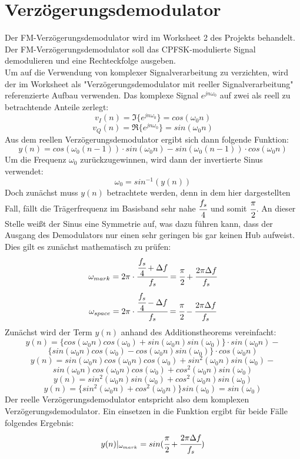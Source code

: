 \documentclass{article}
\begin{document}
\section{Verzögerungsdemodulator} \label{sec:fm-demod}
Der FM-Verzögerungsdemodulator wird im Worksheet 2 des Projekts behandelt.
Der FM-Verzögerungsdemodulator soll das \ac{CPFSK}-modulierte Signal demodulieren und eine Rechteckfolge ausgeben.\\
Um auf die Verwendung von komplexer Signalverarbeitung zu verzichten, wird der im Worksheet als "Verzögerungsdemodulator mit 
reeller Signalverarbeitung" referenzierte Aufbau verwenden. Das komplexe Signal $e^{jn\omega_0}$ 
auf zwei als reell zu betrachtende Anteile zerlegt:
$$
v_I(n) = \Im\{e^{jn\omega_0}\} = cos(\omega_0 n)
$$
$$
v_Q(n) = \Re{\{e^{jn\omega_0}\}} = sin(\omega_0 n)
$$
Aus dem reellen Verzögerungsdemodulator ergibt sich dann folgende Funktion:
$$
y(n) = cos(\omega_0 (n-1)) \cdot sin(\omega_0 n) - sin(\omega_0 (n-1)) \cdot cos(\omega_0 n) 
$$
Um die Frequenz $\omega_0$ zurückzugewinnen, wird dann der invertierte Sinus verwendet:
$$
\omega_0 = sin^{-1}(y(n))
$$ 
Doch zunächst muss $y(n)$ betrachtete werden, denn in dem hier dargestellten Fall, fällt die Trägerfrequenz im Basisband sehr nahe $\cfrac{f_s}{4}$ und somit $\cfrac{\pi}{2}$. An dieser Stelle weißt der Sinus eine Symmetrie auf, was dazu führen kann, dass der Ausgang des Demodulators nur einen sehr geringen bis gar keinen Hub aufweist. Dies gilt es zunächst mathematisch zu prüfen:
$$
\omega_{mark} = 2 \pi\cdot \cfrac{\cfrac{f_s}{4}+\Delta f}{f_s}=\cfrac{\pi}{2}+\cfrac{2 \pi \Delta f}{f_s}
$$
$$
\omega_{space} = 2 \pi\cdot \cfrac{\cfrac{f_s}{4}-\Delta f}{f_s}=\cfrac{\pi}{2}-\cfrac{2 \pi \Delta f}{f_s}
$$
Zunächst wird der Term $y(n)$ anhand des Additionstheorems vereinfacht:
$$
y(n) = \{cos(\omega_0 n)cos(\omega_0) + sin(\omega_0 n)sin(\omega_0)\} \cdot sin(\omega_0 n) - 
$$
$$
\{sin(\omega_0 n)cos(\omega_0) - cos(\omega_0 n)sin(\omega_0) \} \cdot cos(\omega_0 n) 
$$ 
$$
y(n) = sin(\omega_0 n)cos(\omega_0 n)cos(\omega_0) + sin^2(\omega_0 n)sin(\omega_0) - 
$$
$$
sin(\omega_0 n)cos(\omega_0 n)cos(\omega_0) + cos^2(\omega_0 n)sin(\omega_0) 
$$ 
$$
y(n) = sin^2(\omega_0 n)sin(\omega_0) + cos^2(\omega_0 n)sin(\omega_0) 
$$
$$
y(n) = \{sin^2(\omega_0 n) + cos^2(\omega_0 n)\}sin(\omega_0) = sin(\omega_0)
$$
Der reelle Verzögerungsdemodulator entspricht also dem komplexen Verzögerungsdemodulator. Ein einsetzen in die Funktion ergibt für beide Fälle folgendes Ergebnis:
$$
y(n)\arrowvert_{\omega_{mark}} = sin(\cfrac{\pi}{2}+\cfrac{2 \pi \Delta f}{f_s})
$$
\end{document}
